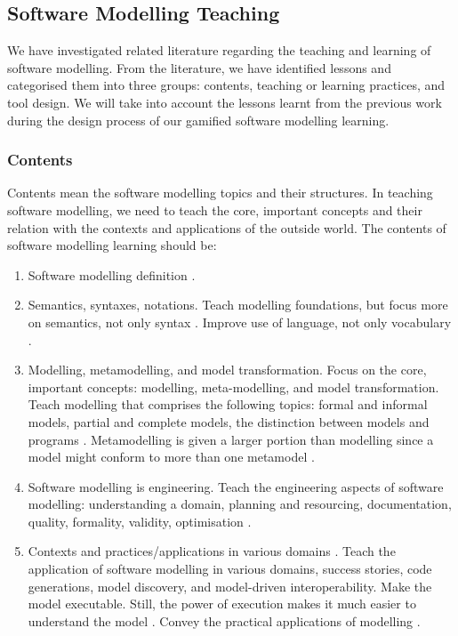 \documentclass[12pt, a4paper]{report}
\begin{document}
\subsection{Software Modelling Teaching}
\label{Software Modelling Teaching}
We have investigated related literature regarding the teaching and learning of software modelling. From the literature, we have identified lessons and categorised them into three groups: contents, teaching or learning practices, and tool design. We will take into account the lessons learnt from the previous work during the design process of our gamified software modelling learning. 

\subsubsection{Contents}
Contents mean the software modelling topics and their structures. In teaching software modelling, we need to teach the core, important concepts and their relation with the contexts and applications of the outside world. The contents of software modelling learning should be:
\begin{enumerate}
\item Software modelling definition \cite{borstler2012teaching}.
\item Semantics, syntaxes, notations. Teach modelling foundations, but focus more on semantics, not only syntax \cite{borstler2012teaching}. Improve use of language, not only vocabulary \cite{bezivin2009teaching}.
\item Modelling, metamodelling, and model transformation. Focus on the core, important concepts: modelling, meta-modelling, and model transformation. Teach modelling that comprises the following topics: formal and informal models, partial and complete models, the distinction between models and programs \cite{bezivin2009teaching}. Metamodelling is given a larger portion than modelling since a model might conform to more than one metamodel \cite{ober2007teaching}.
\item Software modelling is engineering. Teach the engineering aspects of software modelling: understanding a domain, planning and resourcing, documentation, quality, formality, validity, optimisation \cite{paige2014bad}.
\item Contexts and practices/applications in various domains \cite{paige2014bad}. Teach the application of software modelling in various domains, success stories, code generations, model discovery, and model-driven interoperability. Make the model executable. Still, the power of execution makes it much easier to understand the model \cite{bezivin2009teaching}. Convey the practical applications of modelling \cite{borstler2012teaching}.
\end{enumerate}
\end{document}
